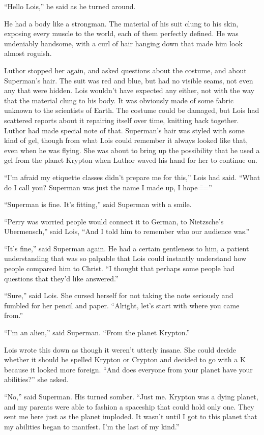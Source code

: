 \documentclass[ebook,12pt]{memoir}
\begin{document}
``Hello Lois,'' he said as he turned around.

He had a body like a strongman. The material of his suit clung to his
skin, exposing every muscle to the world, each of them perfectly
defined. He was undeniably handsome, with a curl of hair hanging down
that made him look almost roguish.

Luthor stopped her again, and asked questions about the costume, and
about Superman's hair. The suit was red and blue, but had no visible
seams, not even any that were hidden. Lois wouldn't have expected any
either, not with the way that the material clung to his body. It was
obviously made of some fabric unknown to the scientists of Earth. The
costume could be damaged, but Lois had scattered reports about it
repairing itself over time, knitting back together. Luthor had made
special note of that. Superman's hair was styled with some kind of gel,
though from what Lois could remember it always looked like that, even
when he was flying. She was about to bring up the possibility that he
used a gel from the planet Krypton when Luthor waved his hand for her to
continue on.

``I'm afraid my etiquette classes didn't prepare me for this,'' Lois had
said. ``What do I call you? Superman was just the name I made up, I
hope\===''

``Superman is fine. It's fitting,'' said Superman with a smile.

``Perry was worried people would connect it to German, to Nietzsche's
Ubermensch,'' said Lois, ``And I told him to remember who our audience
was.''

``It's fine,'' said Superman again. He had a certain gentleness to him,
a patient understanding that was so palpable that Lois could instantly
understand how people compared him to Christ. ``I thought that perhaps
some people had questions that they'd like answered.''

``Sure,'' said Lois. She cursed herself for not taking the note
seriously and fumbled for her pencil and paper. ``Alright, let's start
with where you came from.''

``I'm an alien,'' said Superman. ``From the planet Krypton.''

Lois wrote this down as though it weren't utterly insane. She could
decide whether it should be spelled Krypton or Crypton and decided to go
with a K because it looked more foreign. ``And does everyone from your
planet have your abilities?'' she asked.

``No,'' said Superman. His turned somber. ``Just me. Krypton was a dying
planet, and my parents were able to fashion a spaceship that could hold
only one. They sent me here just as the planet imploded. It wasn't until
I got to this planet that my abilities began to manifest. I'm the last
of my kind.''
\end{document}
